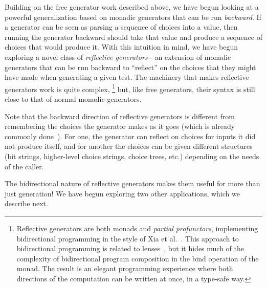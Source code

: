 Building on the free generator work described above, we have begun looking at
a powerful generalization based on
monadic generators that can be run {\em backward}.
%
If a generator can be seen as parsing a sequence of choices into a
value, then running the
generator backward should take that value and produce a sequence of choices that
would produce it.  With this intuition in mind, we have begun
exploring a novel class of {\em reflective
generators}---an extension of monadic generators that can be run backward to
``reflect'' on the choices that they might have made when generating a
given test. The machinery 
that makes reflective generators work is quite complex,%
\footnote{Reflective generators are both monads and {\em
    partial profunctors},
implementing bidirectional programming in the style of Xia et
al.~\cite{xia2019composing}. This approach to bidirectional programming is
related to lenses~\cite{foster2009bidirectional}, but it hides much of the
complexity of bidirectional program composition in the bind operation of the
monad. The result is an elegant programming experience where both directions of
the computation can be written at once, in a type-safe way.}
but, like free generators, their syntax is still close to that of normal
monadic generators.

Note that the backward direction of reflective generators is different from
remembering the choices the generator makes as it goes (which is already
commonly done~\cite{maciver2019hypothesis,hatfield-dodds_hypofuzz_nodate}). For
one, the generator can reflect on choices for inputs it did not produce itself,
and for another the choices can be given different structures (bit strings,
higher-level choice strings, choice trees, etc.) depending on the needs of the
caller.

The bidirectional nature of reflective generators makes them useful
for more than just generation!  We have begun exploring two other
applications, which we describe next.


